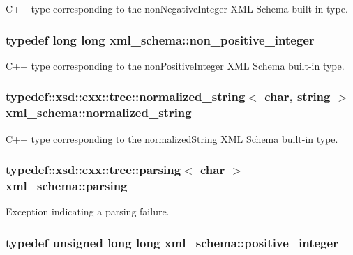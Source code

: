 C++ type corresponding to the non\-Negative\-Integer X\-M\-L Schema built-\/in type. 

\hypertarget{namespacexml__schema_a3de6073e510eb8edd71ddc6e0256e2f9}{
\subsubsection[{non\-\_\-positive\-\_\-integer}]{\setlength{\rightskip}{0pt plus 5cm}typedef long long {\bf xml\-\_\-schema\-::non\-\_\-positive\-\_\-integer}}}\label{namespacexml__schema_a3de6073e510eb8edd71ddc6e0256e2f9}


C++ type corresponding to the non\-Positive\-Integer X\-M\-L Schema built-\/in type. 

\hypertarget{namespacexml__schema_a72078e45c15d8879c64071dea056f60c}{
\subsubsection[{normalized\-\_\-string}]{\setlength{\rightskip}{0pt plus 5cm}typedef\-::xsd\-::cxx\-::tree\-::normalized\-\_\-string$<$ char, {\bf string} $>$ {\bf xml\-\_\-schema\-::normalized\-\_\-string}}}\label{namespacexml__schema_a72078e45c15d8879c64071dea056f60c}


C++ type corresponding to the normalized\-String X\-M\-L Schema built-\/in type. 

\hypertarget{namespacexml__schema_afbb8ed049be1751901785a29a6d13942}{
\subsubsection[{parsing}]{\setlength{\rightskip}{0pt plus 5cm}typedef\-::xsd\-::cxx\-::tree\-::parsing$<$ char $>$ {\bf xml\-\_\-schema\-::parsing}}}\label{namespacexml__schema_afbb8ed049be1751901785a29a6d13942}


Exception indicating a parsing failure. 

\hypertarget{namespacexml__schema_abe9d639a15a121d2868ae2f9c974ca24}{
\subsubsection[{positive\-\_\-integer}]{\setlength{\rightskip}{0pt plus 5cm}typedef unsigned long long {\bf xml\-\_\-schema\-::positive\-\_\-integer}}}\label{namespacexml__schema_abe9d639a15a121d2868ae2f9c974ca24}


